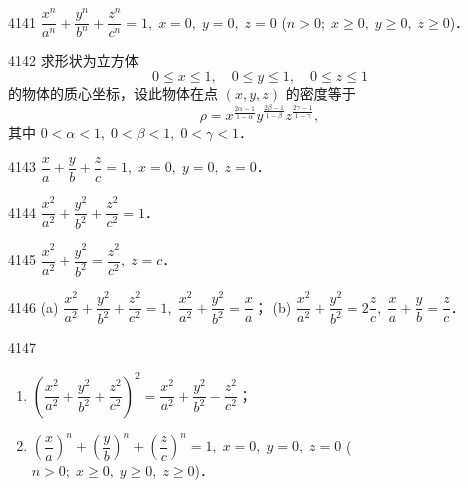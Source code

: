 \begin{prob}[S]{4141}
$\dfrac{x^n}{a^n} + \dfrac{y^n}{b^n} + \dfrac{z^n}{c^n} = 1,\; x = 0,\; y = 0,\; z = 0$ ($n > 0;\; x \geqslant 0,\; y \geqslant 0,\; z \geqslant 0$)．
\end{prob}

\begin{prob}[M]{4142}
求形状为立方体
\[
0 \leqslant x \leqslant 1, \quad 0 \leqslant y \leqslant 1, \quad 0 \leqslant z \leqslant 1
\]
的物体的质心坐标，设此物体在点 $(x,y,z)$ 的密度等于
\[
\rho = x^{\frac{2\alpha-1}{1-\alpha}} y^{\frac{2\beta-1}{1-\beta}} z^{\frac{2\gamma-1}{1-\gamma}},
\]
其中 $0 < \alpha < 1,\; 0 < \beta < 1,\; 0 < \gamma < 1$．
\end{prob}


\begin{prob}[S]{4143}
$\dfrac{x}{a} + \dfrac{y}{b} + \dfrac{z}{c} = 1,\; x = 0,\; y = 0,\; z = 0$．
\end{prob}

\begin{prob}[S]{4144}
$\dfrac{x^2}{a^2} + \dfrac{y^2}{b^2} + \dfrac{z^2}{c^2} = 1$．
\end{prob}

\begin{prob}[S]{4145}
$\dfrac{x^2}{a^2} + \dfrac{y^2}{b^2} = \dfrac{z^2}{c^2},\; z = c$．
\end{prob}

\begin{prob}[M]{4146}
(a) $\dfrac{x^2}{a^2} + \dfrac{y^2}{b^2} + \dfrac{z^2}{c^2} = 1,\; \dfrac{x^2}{a^2} + \dfrac{y^2}{b^2} = \dfrac{x}{a}$；\qquad
(b) $\dfrac{x^2}{a^2} + \dfrac{y^2}{b^2} = 2\dfrac{z}{c},\; \dfrac{x}{a} + \dfrac{y}{b} = \dfrac{z}{c}$．
\end{prob}

\begin{prob}[M]{4147}
\begin{enumerate}[label=(\alph*), itemsep=2pt, topsep=3pt]
  \item $\left(\dfrac{x^2}{a^2} + \dfrac{y^2}{b^2} + \dfrac{z^2}{c^2}\right)^2 = \dfrac{x^2}{a^2} + \dfrac{y^2}{b^2} - \dfrac{z^2}{c^2}$；
  \item $\left(\dfrac{x}{a}\right)^n + \left(\dfrac{y}{b}\right)^n + \left(\dfrac{z}{c}\right)^n = 1,\; x = 0,\; y = 0,\; z = 0$ ($n > 0;\; x \geqslant 0,\; y \geqslant 0,\; z \geqslant 0$)．
\end{enumerate}
\end{prob}

